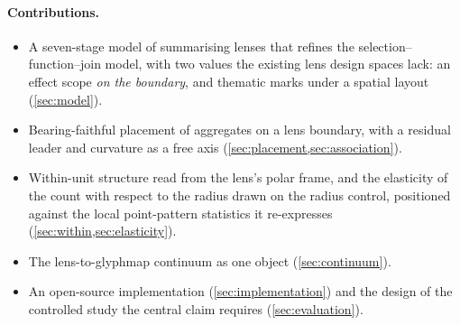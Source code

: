 \paragraph{Contributions.}
\begin{itemize}[leftmargin=*, itemsep=1pt]
  \item A seven-stage model of summarising lenses that refines the
    selection--function--join model, with two values the existing lens design
    spaces lack: an effect scope \emph{on the boundary}, and thematic marks
    under a spatial layout (\cref{sec:model}).
  \item Bearing-faithful placement of aggregates on a lens boundary, with a
    residual leader and curvature as a free axis (\cref{sec:placement,sec:association}).
  \item Within-unit structure read from the lens's polar frame, and the
    elasticity of the count with respect to the radius drawn on the radius
    control, positioned against the local point-pattern statistics it
    re-expresses (\cref{sec:within,sec:elasticity}).
  \item The lens-to-glyphmap continuum as one object (\cref{sec:continuum}).
  \item An open-source implementation (\cref{sec:implementation}) and the
    design of the controlled study the central claim requires
    (\cref{sec:evaluation}).
\end{itemize}

